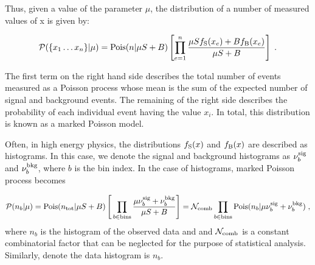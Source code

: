 Thus, given a value of the parameter $\mu$, the distribution of a number of measured values of x is given by:

\begin{eqnarray}
{\cal P}(\{x_1\dots x_n\} | \mu)=  \textrm{Pois}(n | \mu S+B) \left[ \prod_{e=1}^n \frac{\mu S f_{\rm S}(x_e) + B f_{\rm B}(x_e)}{\mu S+B}\right ] \; .
\end{eqnarray}

The first term on the right hand side describes the total number of events measured as a Poisson process whose mean is the sum of the expected number of signal and background events.
The remaining of the right side describes the probability of each individual event having the value $x_i$.
In total, this distribution is known as a marked Poisson model.

Often, in high energy physics, the distributions $f_{\rm S}(x)$ and $f_{\rm B}(x)$ are described as histograms.
In this case, we denote the signal and background histograms as $\nu_b^{\rm sig}$ and $\nu_b^{\rm bkg}$, where $b$ is the bin index.
In the case of histograms,  marked Poisson process becomes

\begin{eqnarray}
{\cal P}(n_b |\mu)=  \textrm{Pois}(n_{\rm tot} | \mu S + B) \left[\, \prod_{b\in\rm bins}\frac{\mu \nu_b^{\rm sig} + \nu_b^{\rm bkg}}{\mu S + B}\right ] = \mathcal{N}_{\rm comb} \prod_{b\in\rm bins} \textrm{Pois}(n_b | \mu \nu_{b}^{\rm sig} + \nu_{b}^{\rm bkg}) \; ,
\end{eqnarray}
where $n_b$ is the histogram of the observed data and and $\mathcal{N}_{\rm comb}$ is a constant combinatorial factor that can be neglected for the purpose of statistical analysis.   
Similarly, denote the data histogram is $n_b$.


